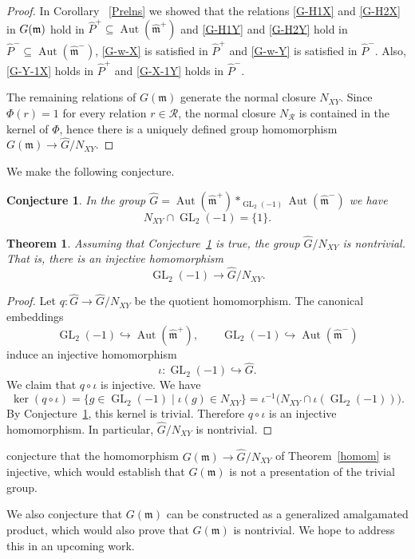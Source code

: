 \documentclass[11pt,letterpaper]{amsart}
\newcounter{thecounter}
\numberwithin{thecounter}{section}
\newtheorem{theorem}[thecounter]{Theorem}
\newtheorem{conjecture}[thecounter]{Conjecture}
\theoremstyle{definition}
\DeclareMathOperator{\GL}{GL}
\DeclareMathOperator{\Aut}{Aut}
\newcommand{\Php}{{\widehat{P}^+}}
\newcommand{\Phm}{{\widehat{P}^-}}
\newcommand{\mhat}{{\widehat{\mathfrak{m}}}}
\begin{document}
\begin{proof}
In Corollary ~\ref{Prelns} we showed that the relations
\eqref{G-H1X} and \eqref{G-H2X} in $G(\frak m)$ hold in $\Php\subseteq\Aut(\mhat^+)$ and 
\eqref{G-H1Y} and \eqref{G-H2Y} hold in $\Phm\subseteq\Aut(\mhat^-)$, \eqref{G-w-X} is satisfied in $\Php$ and \eqref{G-w-Y} is satisfied in $\Phm$.   Also, \eqref{G-Y-1X} holds in $\widehat{P}^+$ and \eqref{G-X-1Y} holds in $\widehat{P}^-$.

The remaining relations of $G(\mathfrak{m})$ generate the normal closure $N_{XY}$. Since $\Phi(r) = 1$ for every relation $r \in \mathcal{R}$, the normal closure $N_{\mathcal{R}}$ is contained in the kernel of $\Phi$, hence there is a uniquely defined group homomorphism $G(\mathfrak{m}) \to \widehat{G}/N_{XY}$.
\end{proof}


We make the following conjecture.
\begin{conjecture}\label{NXY} In the group
$
\widehat{G}
=
\Aut(\widehat{\mathfrak m}^{+})
*_{\GL_2(-1)}
\Aut(\widehat{\mathfrak m}^{-})
$
we have
\[
N_{XY}\cap \GL_2(-1)=\{1\}.
\]
\end{conjecture}


\begin{theorem} Assuming that  Conjecture~\ref{NXY} is true, the group $\widehat{G}/N_{XY}$ is nontrivial. That is, there is an injective homomorphism $$\GL_2(-1)\to \widehat{G}/N_{XY}.$$
\end{theorem}


\begin{proof}
Let
$
q:\widehat{G}\longrightarrow
\widehat{G}/N_{XY}
$
be the quotient homomorphism. The canonical embeddings
\[
\GL_2(-1)\hookrightarrow \Aut(\widehat{\mathfrak m}^{+}),
\qquad
\GL_2(-1)\hookrightarrow \Aut(\widehat{\mathfrak m}^{-})
\]
induce an injective homomorphism
\[
\iota:\GL_2(-1)\hookrightarrow
\widehat{G}.
\]
We claim that \(q\circ \iota\) is injective. We have
\[
\ker(q\circ \iota)
=
\{g\in \GL_2(-1)\mid \iota(g)\in N_{XY}\}
=
\iota^{-1}\bigl(N_{XY}\cap \iota(\GL_2(-1))\bigr).
\]
By Conjecture~\ref{NXY}, this kernel is trivial.
Therefore \(q\circ \iota\) is an injective homomorphism. 
In particular, $\widehat{G}/N_{XY}$ is nontrivial.
\end{proof}

 conjecture  that the homomorphism $G(\mathfrak m)\to \widehat{G}/N_{XY}$ of Theorem~\ref{homom} is injective, which would establish   that $G(\mathfrak m)$ is not a presentation of the trivial group.

We also conjecture that $G(\mathfrak m)$ can be constructed as a generalized amalgamated product, which would also prove that $G(\mathfrak m)$ is nontrivial. We hope to address this in an upcoming work.



{}
\end{document}
